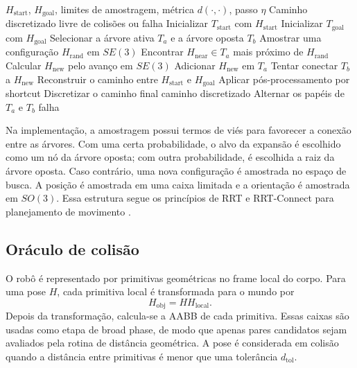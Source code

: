 \documentclass[12pt,a4paper]{article}
\begin{document}
\begin{algorithm}[H]
\caption{RRT bidirecional em \(SE(3)\)}
\label{alg:rrt_se3_bidirectional}
\begin{algorithmic}[1]
\Require \(H_{\mathrm{start}}\), \(H_{\mathrm{goal}}\), limites de amostragem, métrica \(d(\cdot,\cdot)\), passo \(\eta\)
\Ensure Caminho discretizado livre de colisões ou falha
\State Inicializar \(T_{\mathrm{start}}\) com \(H_{\mathrm{start}}\)
\State Inicializar \(T_{\mathrm{goal}}\) com \(H_{\mathrm{goal}}\)
    \State Selecionar a árvore ativa \(T_a\) e a árvore oposta \(T_b\)
    \State Amostrar uma configuração \(H_{\mathrm{rand}}\) em \(SE(3)\)
    \State Encontrar \(H_{\mathrm{near}}\in T_a\) mais próximo de \(H_{\mathrm{rand}}\)
    \State Calcular \(H_{\mathrm{new}}\) pelo avanço em \(SE(3)\)
        \State Adicionar \(H_{\mathrm{new}}\) em \(T_a\)
        \State Tentar conectar \(T_b\) a \(H_{\mathrm{new}}\)
            \State Reconstruir o caminho entre \(H_{\mathrm{start}}\) e \(H_{\mathrm{goal}}\)
            \State Aplicar pós-processamento por shortcut
            \State Discretizar o caminho final
            \State \Return caminho discretizado
        \EndIf
    \EndIf
    \State Alternar os papéis de \(T_a\) e \(T_b\)
\EndFor
\State \Return falha
\end{algorithmic}
\end{algorithm}

Na implementação, a amostragem possui termos de viés para favorecer a conexão
entre as árvores. Com uma certa probabilidade, o alvo da expansão é escolhido
como um nó da árvore oposta; com outra probabilidade, é escolhida a raiz da
árvore oposta. Caso contrário, uma nova configuração é amostrada no espaço de
busca. A posição é amostrada em uma caixa limitada e a orientação é amostrada em
\(SO(3)\). Essa estrutura segue os princípios de RRT e RRT-Connect para
planejamento de movimento \cite{LaValle2006,Choset2005,KuffnerLaValle2000}.

\subsection{Oráculo de colisão}

O robô é representado por primitivas geométricas no frame local do corpo. Para
uma pose \(H\), cada primitiva local é transformada para o mundo por
\[
H_{\mathrm{obj}} = H H_{\mathrm{local}}.
\]
Depois da transformação, calcula-se a AABB de cada primitiva. Essas caixas são
usadas como etapa de broad phase, de modo que apenas pares candidatos sejam
avaliados pela rotina de distância geométrica. A pose é considerada em colisão
quando a distância entre primitivas é menor que uma tolerância
\(d_{\mathrm{tol}}\).
\end{document}
